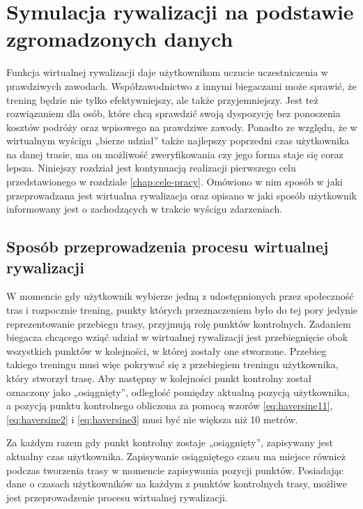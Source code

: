 \chapter{Symulacja rywalizacji na podstawie zgromadzonych danych}\label{chap:symulacja-rywalizacji}
Funkcja wirtualnej rywalizacji daje użytkownikom uczucie uczestniczenia w prawdziwych zawodach. Współzawodnictwo z innymi biegaczami może sprawić, że trening będzie nie tylko efektywniejszy, ale także przyjemniejszy. Jest też rozwiązaniem dla osób, które chcą sprawdzić swoją dyspozycję bez ponoszenia kosztów podróży oraz wpisowego na prawdziwe zawody. Ponadto ze względu, że w wirtualnym wyścigu „bierze udział” także najlepszy poprzedni czas użytkownika na danej trasie, ma on możliwość zweryfikowania czy jego forma staje się coraz lepsza. Niniejszy rozdział jest kontynuacją realizacji pierwszego celu przedstawionego w rozdziale \ref{chap:cele-pracy}. Omówiono w nim sposób w jaki przeprowadzana jest wirtualna rywalizacja oraz opisano w jaki sposób użytkownik informowany jest o zachodzących w trakcie wyścigu zdarzeniach.
\section{Sposób przeprowadzenia procesu wirtualnej rywalizacji}
W momencie gdy użytkownik wybierze jedną z udostępnionych przez społeczność tras i rozpocznie trening, punkty których przeznaczeniem było do tej pory jedynie reprezentowanie przebiegu trasy, przyjmują rolę punktów kontrolnych. Zadaniem biegacza chcącego wziąć udział w wirtualnej rywalizacji jest przebiegnięcie obok wszystkich punktów w kolejności, w której zostały one stworzone. Przebieg takiego treningu musi więc pokrywać się z przebiegiem treningu użytkownika, który stworzył trasę. Aby następny w kolejności punkt kontrolny został oznaczony jako „osiągnięty”, odległość pomiędzy aktualną pozycją użytkownika, a pozycją punktu kontrolnego obliczona za pomocą wzorów \ref{eq:haversine11},  \ref{eq:haversine2} i \ref{eq:haversine3} musi być nie większa niż 10 metrów.

Za każdym razem gdy punkt kontrolny zostaje „osiągnięty”, zapisywany jest aktualny czas użytkownika. Zapisywanie osiągniętego czasu ma miejsce również podczas tworzenia trasy w momencie zapisywania pozycji punktów. Posiadając dane o czasach użytkowników na każdym z punktów kontrolnych trasy, możliwe jest przeprowadzenie procesu wirtualnej rywalizacji.

